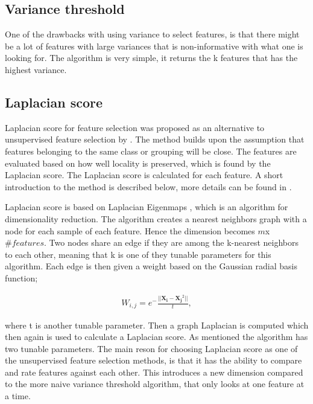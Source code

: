     
    \subsection{Variance threshold}\label{subsec:var_thres}
    
        One of the drawbacks with using variance to select features, is that there might be a lot of features with large variances that is non-informative with what one is looking for. The algorithm is very simple, it returns the k features that has the highest variance. 
        
    
    \subsection{Laplacian score}\label{subsec:lapl_score}
        Laplacian score for feature selection was proposed as an alternative to unsupervised feature selection by \cite{He2005}. The method builds upon the assumption that features belonging to the same class or grouping will be close. The features are evaluated based on how well locality is preserved, which is found by the Laplacian score. The Laplacian score is calculated for each feature. A short introduction to the method is described below, more details can be found in \cite{He2005}. 
        
        Laplacian score is based on Laplacian Eigenmaps \cite{laplcian score for feature selection}, which is an algorithm for dimensionality reduction. The algorithm creates a nearest neighbors graph with a node for each sample of each feature. Hence the dimension becomes $m$x$\#features$. Two nodes share an edge if they are among the k-nearest neighbors to each other, meaning that k is one of they tunable parameters for this algorithm. Each edge is then given a weight based on the Gaussian radial basis function;
        
        \begin{align}\label{eq:tech_LS}
            W_{i,j} = e^-{\frac{||{\bm{X_i}-\bm{X_j}}^2||}{t}},
        \end{align}
        
        where t is another tunable parameter. Then a graph Laplacian is computed which then again is used to calculate a Laplacian score. As mentioned the algorithm has two tunable parameters. The main reson for choosing Laplacian score as one of the unsupervised feature selection methods, is that it has the ability to compare and rate features against each other. This introduces a new dimension compared to the more naive variance threshold algorithm, that only looks at one feature at a time. 
    

